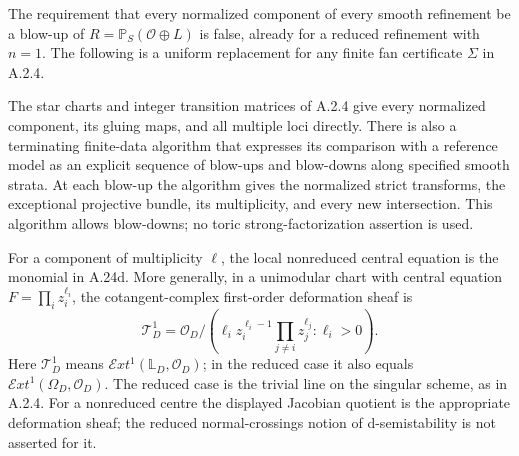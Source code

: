 \begin{proposition}\label{push:A25}
The requirement that every normalized component of every
smooth refinement be a blow-up of
$R=\mathbb P_S(\mathcal O\oplus L)$ is false, already
for a reduced refinement with $n=1$.
The following is a uniform replacement for any finite
fan certificate $\Sigma$ in A.2.4.

The star charts and integer transition matrices of A.2.4
give every normalized component, its gluing maps, and
all multiple loci directly. There is also a terminating
finite-data algorithm that expresses its comparison
with a reference model as an explicit sequence of
blow-ups and blow-downs along specified smooth strata.
At each blow-up the algorithm gives the normalized
strict transforms, the exceptional projective bundle,
its multiplicity, and every new intersection.
This algorithm allows blow-downs; no toric
strong-factorization assertion is used.

For a component of multiplicity $\ell$, the local
nonreduced central equation is the monomial in A.24d.
More generally, in a unimodular chart with central
equation $F=\prod_i z_i^{\ell_i}$, the cotangent-complex
first-order deformation sheaf is
\[
 \mathcal T^1_D
  =\mathcal O_D\Big/
    \left(\ell_i z_i^{\ell_i-1}
          \prod_{j\ne i}z_j^{\ell_j}:\ell_i>0\right).
 \tag{A.25a}
\]
Here $\mathcal T^1_D$ means
$\mathcal Ext^1(\mathbb L_D,\mathcal O_D)$; in the
reduced case it also equals
$\mathcal Ext^1(\Omega_D,\mathcal O_D)$.
The reduced case is the trivial line on the singular
scheme, as in A.2.4. For a nonreduced centre the displayed
Jacobian quotient is the appropriate deformation sheaf;
the reduced normal-crossings notion of d-semistability
is not asserted for it.
\end{proposition}
